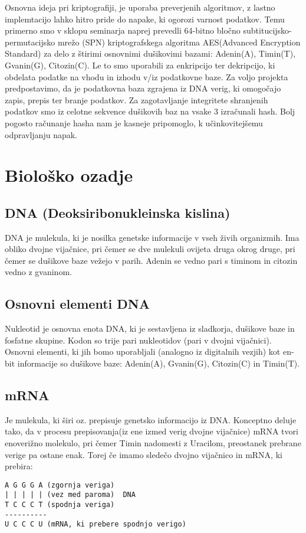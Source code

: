 \documentclass[graybox, envcountchap]{svmult}
\begin{document}
\newpage

\noindent
Osnovna ideja pri kriptografiji, je uporaba preverjenih algoritmov, z lastno implemtacijo lahko hitro pride do napake, ki ogorozi varnost podatkov. Temu primerno smo v sklopu seminarja naprej prevedli 64-bitno bločno subtitucijsko-permutacijsko mrežo (SPN) kriptografskega algoritma AES(Advanced Encryption Standard) za delo z štirimi osnovnimi dušikovimi bazami: Adenin(A), Timin(T), Gvanin(G), Citozin(C). Le to smo uporabili za enkripcijo ter dekripcijo, ki obdelata podatke na vhodu in izhodu v/iz podatkovne baze. Za voljo projekta predpostavimo, da je podatkovna baza zgrajena iz DNA verig, ki omogočajo zapis, prepis ter branje podatkov. Za zagotavljanje integritete shranjenih podatkov smo iz celotne sekvence dušikovih baz na vsake 3 izračunali hash. Bolj pogosto računanje hasha nam je kasneje pripomoglo, k učinkovitejšemu odpravljanju napak. 

\section{Biološko ozadje}
\subsection{DNA (Deoksiribonukleinska kislina)}
DNA je mulekula, ki je nosilka genetske informacije v vseh živih organizmih. Ima obliko dvojne vijačnice, pri čemer se dve mulekuli ovijeta druga okrog druge, pri čemer se dušikove baze vežejo v parih. Adenin se vedno pari s timinom in citozin vedno z gvaninom.

\subsection{Osnovni elementi DNA}
Nukleotid je osnovna enota DNA, ki je sestavljena iz sladkorja, dušikove baze in fosfatne skupine. Kodon so trije pari nukleotidov (pari v dvojni vijačnici). Osnovni elementi, ki jih bomo uporabljali (analogno iz digitalnih vezjih) kot en-bit informacije so dušikove baze: Adenin(A), Gvanin(G), Citozin(C) in Timin(T).

\subsection{mRNA}
Je mulekula, ki širi oz. prepisuje genetsko informacijo iz DNA. Konceptno deluje tako, da v procesu prepisovanja(iz ene izmed verig dvojne vijačnice) mRNA tvori enoverižno molekulo, pri čemer Timin nadomesti z Uracilom, preostanek prebrane verige pa ostane enak. Torej če imamo sledečo dvojno vijačnico in mRNA, ki prebira:
\begin{samepage}
\begin{verbatim}
A G G G A (zgornja veriga)
| | | | | (vez med paroma)  DNA
T C C C T (spodnja veriga)
----------
U C C C U (mRNA, ki prebere spodnjo verigo) 
\end{verbatim}
\end{samepage}
\end{document}
